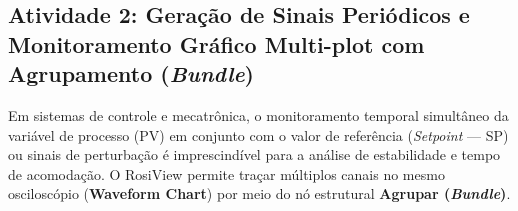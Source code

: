 \documentclass[11pt,a4paper]{article}
\begin{document}
\subsection{Atividade 2: Geração de Sinais Periódicos e Monitoramento Gráfico Multi-plot com Agrupamento (\textit{Bundle})}

Em sistemas de controle e mecatrônica, o monitoramento temporal simultâneo da variável de processo (PV) em conjunto com o valor de referência (\textit{Setpoint} --- SP) ou sinais de perturbação é imprescindível para a análise de estabilidade e tempo de acomodação. O RosiView permite traçar múltiplos canais no mesmo osciloscópio (\textbf{Waveform Chart}) por meio do nó estrutural \textbf{Agrupar (\textit{Bundle})}.
\end{document}
